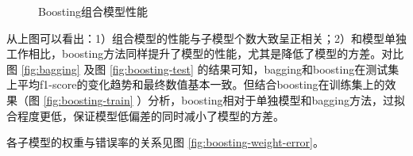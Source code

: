 \documentclass[12pt,a4paper]{article}
\theoremstyle{definition}
\begin{document}
\vspace{-0.03\linewidth}
\begin{figure}[H]
	\centering
	\caption{Boosting组合模型性能}
	\label{fig:boosting}
\end{figure}

\vspace{-0.012\linewidth}
从上图可以看出：1）组合模型的性能与子模型个数大致呈正相关；2）和模型单独工作相比，boosting方法同样提升了模型的性能，尤其是降低了模型的方差。对比图 \ref{fig:bagging} 及图 \ref{fig:boosting-test} 的结果可知，bagging和boosting在测试集上平均f1-score的变化趋势和最终数值基本一致。但结合boosting在训练集上的效果（图 \ref{fig:boosting-train} ）分析，boosting相对于单独模型和bagging方法，过拟合程度更低，保证模型低偏差的同时减小了模型的方差。

\vspace{0.012\linewidth}
各子模型的权重与错误率的关系见图 \ref{fig:boosting-weight-error}。
\end{document}
